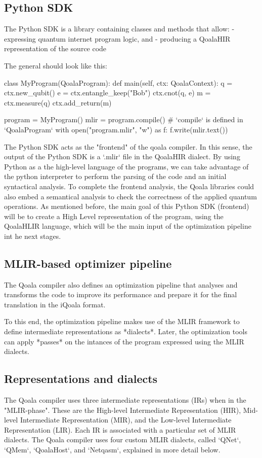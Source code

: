 \subsection{Python SDK}
The Python SDK is a library containing classes and methods that allow:
- expressing quantum internet program logic, and
- producing a QoalaHIR representation of the source code

The general should look like this:

\begin{pycode}
class MyProgram(QoalaProgram):
    def main(self, ctx: QoalaContext):
        q = ctx.new_qubit()
        e = ctx.entangle_keep("Bob")
        ctx.cnot(q, e)
        m = ctx.measure(q)
        ctx.add_return(m)

program = MyProgram()
mlir = program.compile()  # `compile` is defined in `QoalaProgram`
with open("program.mlir", "w") as f:
    f.write(mlir.text())
\end{pycode}

The Python SDK acts as the "frontend" of the qoala compiler. In this sense,
the output of the Python SDK is a `.mlir` file in the QoalaHIR dialect.
By using Python as a the high-level language of the programs, we can take advantage
of the python interpreter to perform the parsing of the code and an initial
syntactical analysis.
To complete the frontend analysis, the Qoala libraries could also embed a
semantical analysis to check the correctness of the applied quantum operations.
As mentioned before, the main goal of this Python SDK (frontend) will be to
create a High Level representation of the program, using the QoalaHLIR
language, which will be the main input of the optimization pipeline int he next stages.


\subsection{MLIR-based optimizer pipeline}
The Qoala compiler also defines an optimization pipeline that analyses and
transforms the code to improve its performance and prepare it for the final
translation in the iQoala format.

To this end, the optimization pipeline makes use of the MLIR framework to
define intermediate representations as *dialects*. Later, the optimization
tools can apply *passes* on the intances of the program expressed using the
MLIR dialects.


\subsection{Representations and dialects}
The Qoala compiler uses three intermediate representations (IRs) when in the "MLIR-phase".
These are the High-level Intermediate Representation (HIR), Mid-level Intermediate Representation (MIR), and the Low-level Intermediate Representation (LIR).
Each IR is associated with a particular set of MLIR dialects.
The Qoala compiler uses four custom MLIR dialects, called `QNet`, `QMem`, `QoalaHost`, and `Netqasm`, explained in more detail below.

